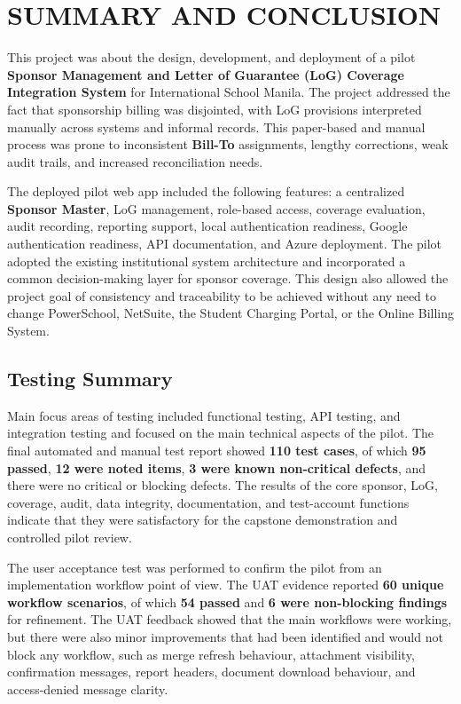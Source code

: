 \section{SUMMARY AND CONCLUSION}

This project was about the design, development, and deployment of a pilot \textbf{Sponsor Management and Letter of Guarantee (LoG) Coverage Integration System} for International School Manila. The project addressed the fact that sponsorship billing was disjointed, with LoG provisions interpreted manually across systems and informal records. This paper-based and manual process was prone to inconsistent \textbf{Bill-To} assignments, lengthy corrections, weak audit trails, and increased reconciliation needs.

The deployed pilot web app included the following features: a centralized \textbf{Sponsor Master}, LoG management, role-based access, coverage evaluation, audit recording, reporting support, local authentication readiness, Google authentication readiness, API documentation, and Azure deployment. The pilot adopted the existing institutional system architecture and incorporated a common decision-making layer for sponsor coverage. This design also allowed the project goal of consistency and traceability to be achieved without any need to change PowerSchool, NetSuite, the Student Charging Portal, or the Online Billing System.

\subsection{Testing Summary}

Main focus areas of testing included functional testing, API testing, and integration testing and focused on the main technical aspects of the pilot. The final automated and manual test report showed \textbf{110 test cases}, of which \textbf{95 passed}, \textbf{12 were noted items}, \textbf{3 were known non-critical defects}, and there were no critical or blocking defects. The results of the core sponsor, LoG, coverage, audit, data integrity, documentation, and test-account functions indicate that they were satisfactory for the capstone demonstration and controlled pilot review.

The user acceptance test was performed to confirm the pilot from an implementation workflow point of view. The UAT evidence reported \textbf{60 unique workflow scenarios}, of which \textbf{54 passed} and \textbf{6 were non-blocking findings} for refinement. The UAT feedback showed that the main workflows were working, but there were also minor improvements that had been identified and would not block any workflow, such as merge refresh behaviour, attachment visibility, confirmation messages, report headers, document download behaviour, and access-denied message clarity.

